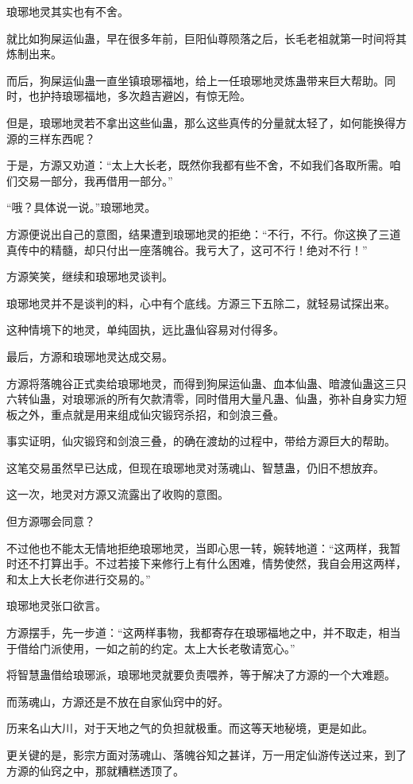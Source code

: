 \begin{this_body}
琅琊地灵其实也有不舍。

就比如狗屎运仙蛊，早在很多年前，巨阳仙尊陨落之后，长毛老祖就第一时间将其炼制出来。

而后，狗屎运仙蛊一直坐镇琅琊福地，给上一任琅琊地灵炼蛊带来巨大帮助。同时，也护持琅琊福地，多次趋吉避凶，有惊无险。

但是，琅琊地灵若不拿出这些仙蛊，那么这些真传的分量就太轻了，如何能换得方源的三样东西呢？

于是，方源又劝道：“太上大长老，既然你我都有些不舍，不如我们各取所需。咱们交易一部分，我再借用一部分。”

“哦？具体说一说。”琅琊地灵。

方源便说出自己的意图，结果遭到琅琊地灵的拒绝：“不行，不行。你这换了三道真传中的精髓，却只付出一座落魄谷。我亏大了，这可不行！绝对不行！”

方源笑笑，继续和琅琊地灵谈判。

琅琊地灵并不是谈判的料，心中有个底线。方源三下五除二，就轻易试探出来。

这种情境下的地灵，单纯固执，远比蛊仙容易对付得多。

最后，方源和琅琊地灵达成交易。

方源将落魄谷正式卖给琅琊地灵，而得到狗屎运仙蛊、血本仙蛊、暗渡仙蛊这三只六转仙蛊，对琅琊派的所有欠款清零，同时借用大量凡蛊、仙蛊，弥补自身实力短板之外，重点就是用来组成仙灾锻窍杀招，和剑浪三叠。

事实证明，仙灾锻窍和剑浪三叠，的确在渡劫的过程中，带给方源巨大的帮助。

这笔交易虽然早已达成，但现在琅琊地灵对荡魂山、智慧蛊，仍旧不想放弃。

这一次，地灵对方源又流露出了收购的意图。

但方源哪会同意？

不过他也不能太无情地拒绝琅琊地灵，当即心思一转，婉转地道：“这两样，我暂时还不打算出手。不过若接下来修行上有什么困难，情势使然，我自会用这两样，和太上大长老你进行交易的。”

琅琊地灵张口欲言。

方源摆手，先一步道：“这两样事物，我都寄存在琅琊福地之中，并不取走，相当于借给门派使用，一如之前的约定。太上大长老敬请宽心。”

将智慧蛊借给琅琊派，琅琊地灵就要负责喂养，等于解决了方源的一个大难题。

而荡魂山，方源还是不放在自家仙窍中的好。

历来名山大川，对于天地之气的负担就极重。而这等天地秘境，更是如此。

更关键的是，影宗方面对荡魂山、落魄谷知之甚详，万一用定仙游传送过来，到了方源的仙窍之中，那就糟糕透顶了。


\end{this_body}
